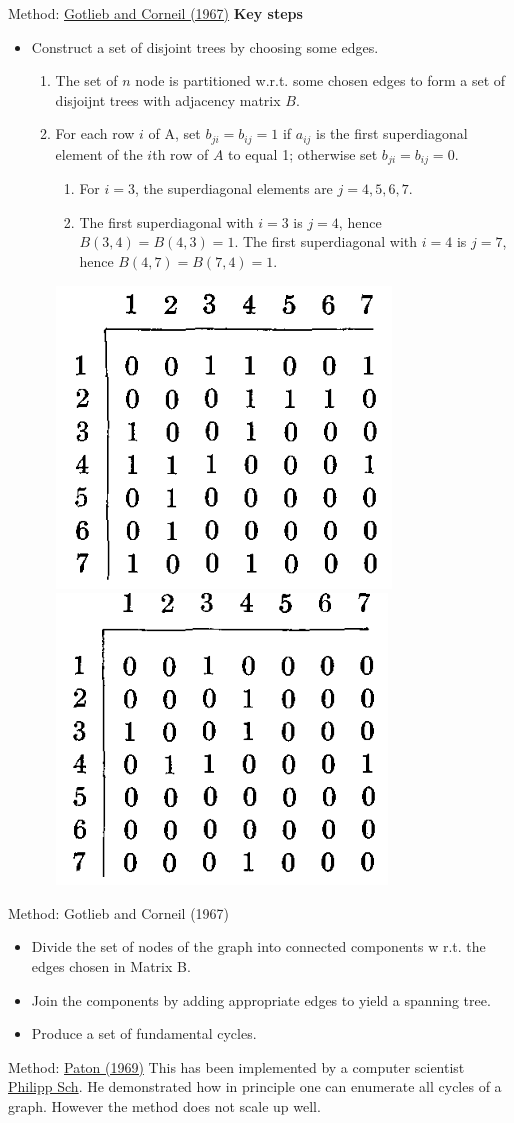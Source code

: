 \documentclass[xcolor=dvipsnames]{beamer}
\begin{document}
\begin{frame}{Method: \href{https://dl.acm.org/doi/pdf/10.1145/363848.363861}{Gotlieb and Corneil (1967)}}
	\textbf{Key steps}
	\begin{itemize}
		\item Construct a set of disjoint trees by choosing some edges. 

		\begin{enumerate}
			\item The set of $n$ node is partitioned w.r.t. some chosen edges to form a set of disjoijnt trees with adjacency matrix $B$.
			\item For each row $i$ of A, set $b_{ji}=b_{ij}=1$ if $a_{ij}$ is the first {\color{red}superdiagonal} element of the $i$th row of $A$ to equal 1; otherwise set $b_{ji}=b_{ij}=0$.
			\begin{enumerate}
				\item For $i=3$, the {\color{red}superdiagonal} elements are $j=4,5,6,7$.
				\item The first {\color{red}superdiagonal} with $i=3$ is $j=4$, hence $B(3,4)=B(4,3)=1$. The first {\color{red}superdiagonal} with $i=4$ is $j=7$, hence $B(4,7)=B(7,4)=1$. 
			\end{enumerate}	
			\centering	
			\includegraphics[height=0.15\textwidth]{matA.png}
			\qquad \qquad
			\includegraphics[height=0.15\textwidth]{matB.png}
		\end{enumerate}
	\end{itemize}
\end{frame}

\begin{frame}{Method: Gotlieb and Corneil (1967)}
\begin{itemize}
	\item Divide the set of nodes of the graph into connected components w r.t. the edges chosen in Matrix B.
	\item Join the components by adding appropriate edges to yield a spanning tree.
	\item Produce a set of fundamental cycles.
\end{itemize}
\end{frame}
\begin{frame}{Method: \href{http://www.cs.kent.edu/~dragan/GraphAn/CycleBasis/p514-paton.pdf}{Paton (1969)}}
	This has been implemented by a computer scientist \href{https://www.codeproject.com/Articles/1158232/Enumerating-All-Cycles-in-an-Undirected-Graph}{Philipp Sch}. He demonstrated how in principle one can enumerate all cycles of a graph. However the method does not scale up well.
\end{frame}
\end{document}
